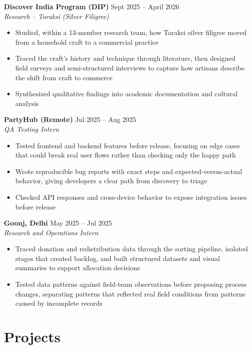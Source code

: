 \documentclass[10pt,a4paper]{article}
\newcommand{\experience}[4]{
    \textbf{#1} \hfill #2\\
    \textit{#3} \hfill #4\\[0.1em]
}
\begin{document}
\experience{Discover India Program (DIP)}{Sept 2025 -- April 2026}{Research -- Taraksi (Silver Filigree)}{}
\begin{itemize}[leftmargin=*, itemsep=0pt, parsep=0pt, topsep=1pt]
    \item Studied, within a 13-member research team, how Taraksi silver filigree moved from a household craft to a commercial practice
    \item Traced the craft's history and technique through literature, then designed field surveys and semi-structured interviews to capture how artisans describe the shift from craft to commerce
    \item Synthesized qualitative findings into academic documentation and cultural analysis
\end{itemize}

\experience{PartyHub (Remote)}{Jul 2025 -- Aug 2025}{QA Testing Intern}{}
\begin{itemize}[leftmargin=*, itemsep=0pt, parsep=0pt, topsep=1pt]
    \item Tested frontend and backend features before release, focusing on edge cases that could break real user flows rather than checking only the happy path
    \item Wrote reproducible bug reports with exact steps and expected-versus-actual behavior, giving developers a clear path from discovery to triage
    \item Checked API responses and cross-device behavior to expose integration issues before release
\end{itemize}

\experience{Goonj, Delhi}{May 2025 -- Jul 2025}{Research and Operations Intern}{}
\begin{itemize}[leftmargin=*, itemsep=0pt, parsep=0pt, topsep=1pt]
    \item Traced donation and redistribution data through the sorting pipeline, isolated stages that created backlog, and built structured datasets and visual summaries to support allocation decisions
    \item Tested data patterns against field-team observations before proposing process changes, separating patterns that reflected real field conditions from patterns caused by incomplete records
\end{itemize}

\section*{Projects}
\end{document}

